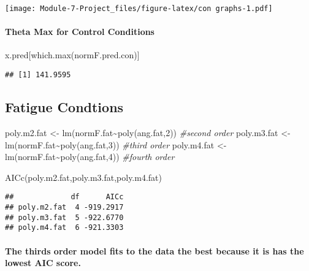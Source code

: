 \documentclass[
]{article}
\newenvironment{Shaded}{\begin{snugshade}}{\end{snugshade}}
\newcommand{\CommentTok}[1]{\textcolor[rgb]{0.56,0.35,0.01}{\textit{#1}}}
\newcommand{\DecValTok}[1]{\textcolor[rgb]{0.00,0.00,0.81}{#1}}
\newcommand{\FunctionTok}[1]{\textcolor[rgb]{0.00,0.00,0.00}{#1}}
\newcommand{\NormalTok}[1]{#1}
\newcommand{\OtherTok}[1]{\textcolor[rgb]{0.56,0.35,0.01}{#1}}
\newcommand{\SpecialCharTok}[1]{\textcolor[rgb]{0.00,0.00,0.00}{#1}}
\begin{document}
\texttt{[image: Module-7-Project\_files/figure-latex/con graphs-1.pdf]}

\hypertarget{theta-max-for-control-conditions}{%
\paragraph{Theta Max for Control
Conditions}\label{theta-max-for-control-conditions}}

\begin{Shaded}
\begin{Highlighting}[]
\NormalTok{x.pred[}\FunctionTok{which.max}\NormalTok{(normF.pred.con)]  }
\end{Highlighting}
\end{Shaded}

\begin{verbatim}
## [1] 141.9595
\end{verbatim}

\hypertarget{fatigue-condtions}{%
\subsection{Fatigue Condtions}\label{fatigue-condtions}}

\begin{Shaded}
\begin{Highlighting}[]
\NormalTok{poly.m2.fat }\OtherTok{\textless{}{-}} \FunctionTok{lm}\NormalTok{(normF.fat}\SpecialCharTok{\textasciitilde{}}\FunctionTok{poly}\NormalTok{(ang.fat,}\DecValTok{2}\NormalTok{)) }\CommentTok{\#second order}
\NormalTok{poly.m3.fat }\OtherTok{\textless{}{-}} \FunctionTok{lm}\NormalTok{(normF.fat}\SpecialCharTok{\textasciitilde{}}\FunctionTok{poly}\NormalTok{(ang.fat,}\DecValTok{3}\NormalTok{)) }\CommentTok{\#third order}
\NormalTok{poly.m4.fat }\OtherTok{\textless{}{-}} \FunctionTok{lm}\NormalTok{(normF.fat}\SpecialCharTok{\textasciitilde{}}\FunctionTok{poly}\NormalTok{(ang.fat,}\DecValTok{4}\NormalTok{)) }\CommentTok{\#fourth order}

\FunctionTok{AICc}\NormalTok{(poly.m2.fat,poly.m3.fat,poly.m4.fat) }
\end{Highlighting}
\end{Shaded}

\begin{verbatim}
##             df      AICc
## poly.m2.fat  4 -919.2917
## poly.m3.fat  5 -922.6770
## poly.m4.fat  6 -921.3303
\end{verbatim}

\hypertarget{the-thirds-order-model-fits-to-the-data-the-best-because-it-is-has-the-lowest-aic-score.}{%
\paragraph{The thirds order model fits to the data the best because it
is has the lowest AIC
score.}\label{the-thirds-order-model-fits-to-the-data-the-best-because-it-is-has-the-lowest-aic-score.}}
\end{document}
